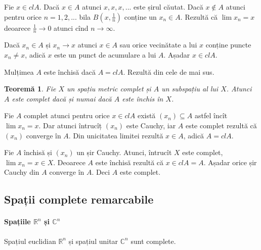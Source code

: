 \documentclass[a4paper,12pt]{article}
\theoremstyle{change}
\newtheorem{theorem}{Teoremă}[section]
\newenvironment{proof}[1][Proof]{\begin{trivlist}
\item[\hskip \labelsep {\bfseries #1}]}{\end{trivlist}}
\begin{document}
\begin{proof}
Fie $x\in cl A$. Dacă $x\in A$ atunci $x,x,x,...$ este șirul căutat. Dacă $x\notin A$ atunci pentru orice $n=1,2,...$ bila $B(x,\frac{1}{n})$ conține un $x_n\in A$. Rezultă că $\lim x_n = x$ deoarece $\frac{1}{n}\to 0$ atunci cînd $n\to\infty$.

Dacă $x_n\in A$ și $x_n\to x$ atunci $x\in A$ sau orice vecinătate a lui $x$ conține puncte $x_n\neq x$, adică $x$ este un punct de acumulare a lui $A$. Așadar $x\in cl A$.

Mulțimea $A$ este închisă dacă $A=cl A$. Rezultă din cele de mai sus.
\end{proof}

\begin{theorem}\label{thm:subspatiu-complet}
Fie $X$ un spațiu metric complet și $A$ un subspațiu al lui $X$. Atunci $A$ este complet dacă și numai dacă $A$ este închis în $X$.
\end{theorem}

\begin{proof}
Fie $A$ complet atunci pentru orice $x\in cl A$ există $(x_n)\subseteq A$ astfel încît $\lim x_n=x$. Dar atunci întrucîț $(x_n)$ este Cauchy, iar $A$ este complet rezultă că $(x_n)$ converge în $A$. Din unicitatea limitei rezultă $x\in A$, adică $A=cl A$.

Fie $A$ închisă și $(x_n)$ un șir Cauchy. Atunci, întrucît $X$ este complet, $\lim x_n = x\in X$. Deoarece $A$ este închisă rezultă că $x\in cl A = A$. Așadar orice șir Cauchy din $A$ converge în $A$. Deci $A$ este complet.
\end{proof}

\subsection{Spații complete remarcabile}

\paragraph{Spațiile $\mathbb{R}^n$ și $\mathbb{C}^n$} Spațiul euclidian $\mathbb{R}^n$ și spațiul unitar $\mathbb{C}^n$ sunt complete.
\end{document}
